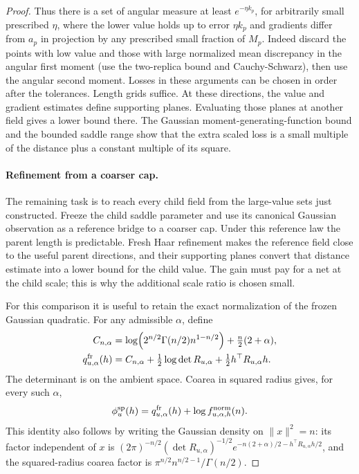 \begin{proof}
Thus there is a set of angular measure at least \(e^{-\eta k_p}\), for
arbitrarily small prescribed \(\eta\), where the lower value holds up to error
\(\eta k_p\) and gradients differ from \(a_p\) in projection by any prescribed
small fraction of \(M_p\). Indeed discard the points with low value and those
with large normalized mean discrepancy in the angular first moment (use the
two-replica bound and Cauchy-Schwarz), then use the angular second moment.
Losses in these arguments can be chosen in order after the tolerances. Length
grids suffice. At these directions, the value and gradient estimates define
supporting planes. Evaluating those planes at another field gives a lower
bound there. The Gaussian moment-generating-function bound and the bounded
saddle range show that the extra scaled loss is a small multiple of the
distance plus a constant multiple of its square.

\paragraph{Refinement from a coarser cap.}
The remaining task is to reach every child field from the large-value sets
just constructed. Freeze the child saddle parameter and use its canonical
Gaussian observation as a reference bridge to a coarser cap. Under this
reference law the parent length is predictable. Fresh Haar refinement makes
the reference field close to the useful parent directions, and their
supporting planes convert that distance estimate into a lower bound for
the child value. The gain must pay for a net at the child scale; this is why
the additional scale ratio is chosen small.

For this comparison it is useful to retain the exact normalization of the
frozen Gaussian quadratic. For any admissible \(\alpha\), define
\begin{equation}\label{cap:frozen-potential}
 \begin{split}
 C_{n,\alpha}
 &=\log\!\left(2^{n/2}\Gamma(n/2)n^{1-n/2}\right)
       +\tfrac n2(2+\alpha),\\
 q_{u,\alpha}^{\rm fr}(h)
 &=C_{n,\alpha}+\tfrac12\log\det R_{u,\alpha}
                   +\tfrac12h^\top R_{u,\alpha}h .
 \end{split}
\end{equation}
The determinant is on the ambient space. Coarea in squared radius gives,
for every such \(\alpha\),
\begin{equation}\label{cap:sphere-frozen-density}
 \phi_u^{\rm sp}(h)
 =q_{u,\alpha}^{\rm fr}(h)+\log f_{u,\alpha,h}^{\rm norm}(n).
\end{equation}
This identity also follows by writing the Gaussian density on
\(\|x\|^2=n\): its factor independent of \(x\) is
\((2\pi)^{-n/2}(\det R_{u,\alpha})^{-1/2}
e^{-n(2+\alpha)/2-h^\top R_{u,\alpha}h/2}\), and the squared-radius
coarea factor is \(\pi^{n/2}n^{n/2-1}/\Gamma(n/2)\).


\end{proof}
